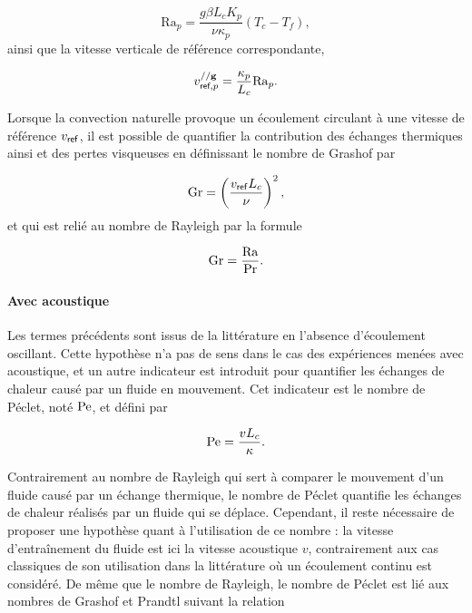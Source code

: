 \begin{equation}
	\mathrm{Ra}_p = \frac{g \beta L_c K_p}{\nu \kappa_p} (T_c-T_f),
	\label{eq:NbrRayleigh_poreux}
\end{equation}
ainsi que la vitesse verticale de référence correspondante, 

\begin{equation}
	v_{\textsf{ref},p}^{// \mathbf g} = \frac{\kappa_p}{L_c} \mathrm{Ra}_p.
	\label{eq:VitesseReference_Rayleigh_poreux}
\end{equation}


Lorsque la convection naturelle provoque un écoulement circulant à une vitesse de référence $v_{\sf ref}$, il est possible de quantifier la contribution des échanges thermiques ainsi  et des pertes visqueuses en définissant le nombre de Grashof par

\begin{equation}
	\mathrm{Gr} = \left( \frac{v_{\sf ref} L_c}{\nu} \right)^2,
	\label{eq:NbrGrashof}
\end{equation}
et qui est relié au nombre de Rayleigh par la formule

\begin{equation}
	\mathrm{Gr} = \frac{\mathrm{Ra}}{\mathrm{Pr}}.
	\label{eq:NbrGrashof_RayleighSurPrandtl}
\end{equation}


\paragraph{Avec acoustique}
Les termes précédents sont issus de la littérature en l'absence d'écoulement oscillant. Cette hypothèse n'a pas de sens dans le cas des expériences menées avec acoustique, et un autre indicateur est introduit pour quantifier les échanges de chaleur causé par un fluide en mouvement. Cet indicateur est le nombre de Péclet, noté $\mathrm{Pe}$, et défini par

\begin{equation}
	\mathrm{Pe} = \frac{v L_c}{\kappa}.
	\label{eq:NbrPeclet}
\end{equation}

Contrairement au nombre de Rayleigh qui sert à comparer le mouvement d'un fluide causé par un échange thermique, le nombre de Péclet quantifie les échanges de chaleur réalisés par un fluide qui se déplace. Cependant, il reste nécessaire de proposer une hypothèse quant à l'utilisation de ce nombre : la vitesse d'entraînement du fluide est ici la vitesse acoustique $v$, contrairement aux cas classiques de son utilisation dans la littérature où un écoulement continu est considéré. De même que le nombre de Rayleigh, le nombre de Péclet est lié aux nombres de Grashof et Prandtl suivant la relation 

